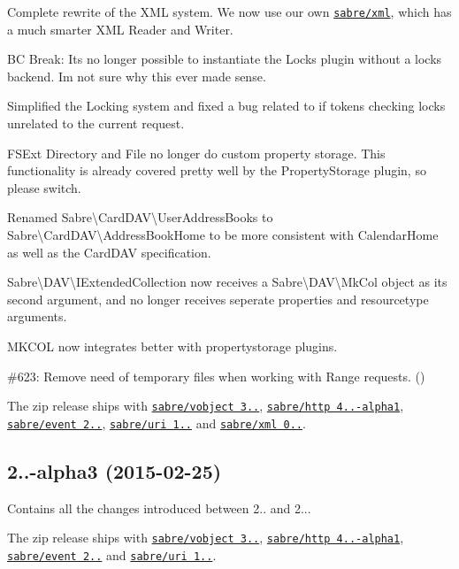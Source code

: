 \begin{DoxyItemize}
\item Complete rewrite of the X\+ML system. We now use our own \href{http://sabre.io/xml/}{\tt sabre/xml}, which has a much smarter X\+ML Reader and Writer.
\item BC Break\+: It\textquotesingle{}s no longer possible to instantiate the Locks plugin without a locks backend. I\textquotesingle{}m not sure why this ever made sense.
\item Simplified the Locking system and fixed a bug related to if tokens checking locks unrelated to the current request.
\item {\ttfamily F\+S\+Ext} Directory and File no longer do custom property storage. This functionality is already covered pretty well by the {\ttfamily Property\+Storage} plugin, so please switch.
\item Renamed {\ttfamily Sabre\textbackslash{}Card\+D\+AV\textbackslash{}User\+Address\+Books} to {\ttfamily Sabre\textbackslash{}Card\+D\+AV\textbackslash{}Address\+Book\+Home} to be more consistent with {\ttfamily Calendar\+Home} as well as the Card\+D\+AV specification.
\item {\ttfamily Sabre\textbackslash{}D\+AV\textbackslash{}I\+Extended\+Collection} now receives a {\ttfamily Sabre\textbackslash{}D\+AV\textbackslash{}Mk\+Col} object as its second argument, and no longer receives seperate properties and resourcetype arguments.
\item {\ttfamily M\+K\+C\+OL} now integrates better with propertystorage plugins.
\item \#623\+: Remove need of temporary files when working with Range requests. ()
\item The zip release ships with \href{http://sabre.io/vobject/}{\tt sabre/vobject 3..}, \href{http://sabre.io/http/}{\tt sabre/http 4..-\/alpha1}, \href{http://sabre.io/event/}{\tt sabre/event 2..}, \href{http://sabre.io/uri/}{\tt sabre/uri 1..} and \href{http://sabre.io/xml/}{\tt sabre/xml 0..}.
\end{DoxyItemize}

\subsection*{2..-\/alpha3 (2015-\/02-\/25) }


\begin{DoxyItemize}
\item Contains all the changes introduced between 2.. and 2...
\item The zip release ships with \href{http://sabre.io/vobject/}{\tt sabre/vobject 3..}, \href{http://sabre.io/http/}{\tt sabre/http 4..-\/alpha1}, \href{http://sabre.io/event/}{\tt sabre/event 2..} and \href{http://sabre.io/uri/}{\tt sabre/uri 1..}.
\end{DoxyItemize}

